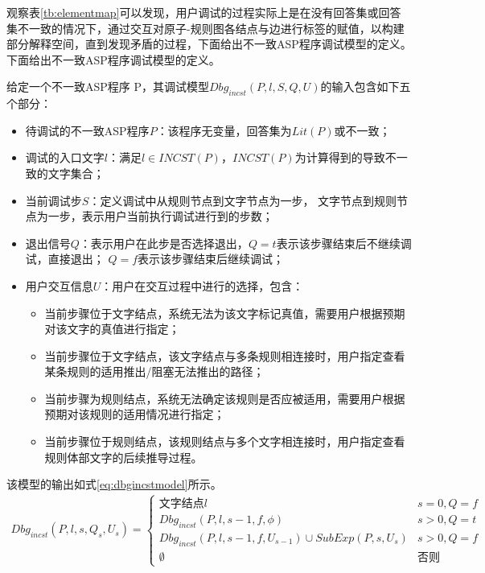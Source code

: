     观察表\ref{tb:elementmap}可以发现，用户调试的过程实际上是在没有回答集或回答集不一致的情况下，通过交互对原子-规则图各结点与边进行标签的赋值，以构建部分解释空间，直到发现矛盾的过程，下面给出不一致ASP程序调试模型的定义。下面给出不一致ASP程序调试模型的定义。
    \begin{definition}[]
        给定一个不一致ASP程序 P，其调试模型$Dbg_{incst}(P, l, S, Q, U)$的输入包含如下五个部分：
        \begin{itemize}[topsep=0pt]
            \setlength\itemsep{-0.3em}
            \item 待调试的不一致ASP程序$P$：该程序无变量，回答集为$Lit(P)$或不一致；
            \item 调试的入口文字$l$：满足$l \in INCST(P)$，$INCST(P)$为计算得到的导致不一致的文字集合；
            \item 当前调试步$S$：定义调试中从规则节点到文字节点为一步， 文字节点到规则节点为一步，表示用户当前执行调试进行到的步数；
            \item 退出信号$Q$：表示用户在此步是否选择退出，$Q=t$表示该步骤结束后不继续调试，直接退出； $Q=f$表示该步骤结束后继续调试；
            \item 用户交互信息$U$：用户在交互过程中进行的选择，包含：
            \begin{itemize}[topsep=0pt, label=$\circ$]
                \setlength\itemsep{-0.3em}
                \item 当前步骤位于文字结点，系统无法为该文字标记真值，需要用户根据预期对该文字的真值进行指定；
                \item 当前步骤位于文字结点，该文字结点与多条规则相连接时，用户指定查看某条规则的适用推出/阻塞无法推出的路径；
                \item 当前步骤为规则结点，系统无法确定该规则是否应被适用，需要用户根据预期对该规则的适用情况进行指定；
                \item 当前步骤位于规则结点，该规则结点与多个文字相连接时，用户指定查看规则体部文字的后续推导过程。
            \end{itemize}
        \end{itemize}
        
        该模型的输出如式\eqref{eq:dbgincstmodel}所示。
        \begin{align}
            Dbg_{incst}(P, l, s, Q_s, U_s)=
            \begin{cases}
                \text{文字结点} l &s = 0, Q = f\\
                Dbg_{incst}(P, l, s-1, f, \phi) &s > 0, Q = t\\
                Dbg_{incst}(P, l, s-1, f, U_{s-1}) \cup SubExp(P, s, U_s) &s > 0, Q = f\\
                \emptyset &\text{否则}
            \end{cases}
        \end{align}\label{eq:dbgincstmodel}
    \end{definition}
